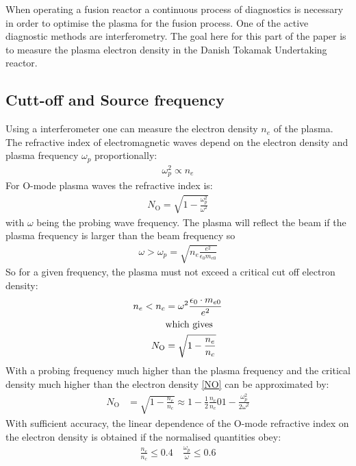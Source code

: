 When operating a fusion reactor a continuous process of diagnostics is necessary in order to optimise the plasma for the fusion process. One of the active diagnostic methods are interferometry.
The goal here for this part of the paper is to measure the plasma electron density in the Danish Tokamak Undertaking reactor.
\subsection{Cutt-off and Source frequency}
Using a interferometer one can measure the electron density \(n_e\) of the plasma. The refractive index of electromagnetic waves depend on the electron density and plasma frequency \(\omega_p\) proportionally:
\begin{align}
	\omega_p^2 \propto n_e
\end{align}
For O-mode plasma waves the refractive index is:
\begin{align}
	N_{\mathrm{O}} = \sqrt{1-\frac{\omega_p^2}{\omega^2}}
\end{align}
with \(\omega\) being the probing wave frequency.
The plasma will reflect the beam if the plasma frequency is larger than the beam frequency so
\begin{align}
	\omega > \omega_p = \sqrt{n_e\frac{e^2}{\epsilon_0 m_{e0}}}
\end{align}
So for a given frequency, the plasma must not exceed a critical cut off electron density:
\begin{align}
	n_e < n_c      & = \omega^2\frac{\epsilon_0\cdot m_{e0}}{e^2} \label{nenc} \\
	               & \qq*{which gives} \nonumber                               \\
	N_{\mathrm{O}} & = \sqrt{1-\frac{n_e}{n_c}}\label{NO}
\end{align}
With a probing frequency much higher than the plasma frequency and the critical density much higher than the electron density \cref{NO} can be approximated by:
\begin{align}
	N_{\mathrm{O}} & = \sqrt{1-\frac{n_e}{n_c}} \approx 1-\frac{1}{2}\frac{n_e}{n_c} 0 1-\frac{\omega_p^2}{2\omega^2}
\end{align}
With sufficient accuracy, the linear dependence of the O-mode refractive index on the electron density is obtained if the normalised quantities obey:
\begin{align}
	\frac{n_e}{n_c} \leq 0.4 \quad \frac{\omega_p}{\omega} \leq 0.6
\end{align}
